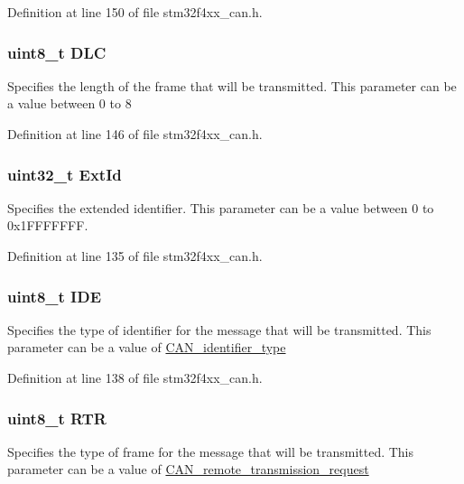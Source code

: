 Definition at line 150 of file stm32f4xx\-\_\-can.\-h.

\hypertarget{struct_can_tx_msg_a5f86974a53a85fb5706e08f8106296b9}{
\subsubsection[{D\-L\-C}]{\setlength{\rightskip}{0pt plus 5cm}uint8\-\_\-t D\-L\-C}}\label{struct_can_tx_msg_a5f86974a53a85fb5706e08f8106296b9}
Specifies the length of the frame that will be transmitted. This parameter can be a value between 0 to 8 

Definition at line 146 of file stm32f4xx\-\_\-can.\-h.

\hypertarget{struct_can_tx_msg_a8625d2aaf6b0b99f0faf0b8cd07debd4}{
\subsubsection[{Ext\-Id}]{\setlength{\rightskip}{0pt plus 5cm}uint32\-\_\-t Ext\-Id}}\label{struct_can_tx_msg_a8625d2aaf6b0b99f0faf0b8cd07debd4}
Specifies the extended identifier. This parameter can be a value between 0 to 0x1\-F\-F\-F\-F\-F\-F\-F. 

Definition at line 135 of file stm32f4xx\-\_\-can.\-h.

\hypertarget{struct_can_tx_msg_accecf260a60cf687f0f9898421aeea86}{
\subsubsection[{I\-D\-E}]{\setlength{\rightskip}{0pt plus 5cm}uint8\-\_\-t I\-D\-E}}\label{struct_can_tx_msg_accecf260a60cf687f0f9898421aeea86}
Specifies the type of identifier for the message that will be transmitted. This parameter can be a value of \hyperlink{group___c_a_n__identifier__type}{C\-A\-N\-\_\-identifier\-\_\-type} 

Definition at line 138 of file stm32f4xx\-\_\-can.\-h.

\hypertarget{struct_can_tx_msg_a131e825d532b66f27dbb74aa80864d37}{
\subsubsection[{R\-T\-R}]{\setlength{\rightskip}{0pt plus 5cm}uint8\-\_\-t R\-T\-R}}\label{struct_can_tx_msg_a131e825d532b66f27dbb74aa80864d37}
Specifies the type of frame for the message that will be transmitted. This parameter can be a value of \hyperlink{group___c_a_n__remote__transmission__request}{C\-A\-N\-\_\-remote\-\_\-transmission\-\_\-request} 

